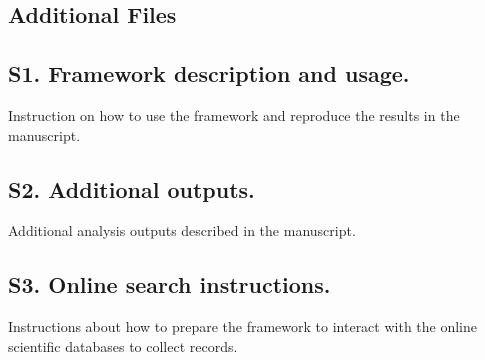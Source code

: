 \documentclass[]{bmcart}
\begin{document}
\begin{backmatter}

\section*{Additional Files}
  \subsection*{S1. Framework description and usage.}
  Instruction on how to use the framework and reproduce the results in
the manuscript.
  \subsection*{S2. Additional outputs.}
  Additional analysis outputs described in the manuscript.
  \subsection*{S3. Online search instructions.}
  Instructions about how to prepare the framework to interact with the
online scientific databases to collect records.

\end{backmatter}
\end{document}
